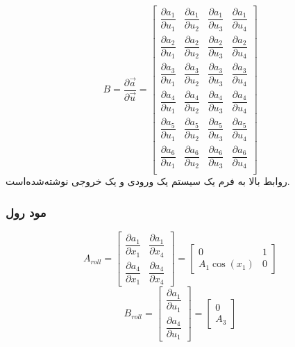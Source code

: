\begin{equation}
	B = \dfrac{\partial \vec a}{\partial \vec u} = 
	\begin{bmatrix}
		\dfrac{\partial  a_1}{\partial  u_1}&
		\dfrac{\partial  a_1}{\partial  u_2}&
		\dfrac{\partial  a_1}{\partial  u_3}&
		\dfrac{\partial  a_1}{\partial  u_4}
		\\[1em]
		\dfrac{\partial  a_2}{\partial  u_1}&
		\dfrac{\partial  a_2}{\partial  u_2}&
		\dfrac{\partial  a_2}{\partial  u_3}&
		\dfrac{\partial  a_2}{\partial  u_4}
		\\[1em]
		\dfrac{\partial  a_3}{\partial  u_1}&
		\dfrac{\partial  a_3}{\partial  u_2}&
		\dfrac{\partial  a_3}{\partial  u_3}&
		\dfrac{\partial  a_3}{\partial  u_4}
		\\[1em]
		\dfrac{\partial  a_4}{\partial  u_1}&
		\dfrac{\partial  a_4}{\partial  u_2}&
		\dfrac{\partial  a_4}{\partial  u_3}&
		\dfrac{\partial  a_4}{\partial  u_4}
		\\[1em]
		\dfrac{\partial  a_5}{\partial  u_1}&
		\dfrac{\partial  a_5}{\partial  u_2}&
		\dfrac{\partial  a_5}{\partial  u_3}&
		\dfrac{\partial  a_5}{\partial  u_4}
		\\[1em]
		\dfrac{\partial  a_6}{\partial  u_1}&
		\dfrac{\partial  a_6}{\partial  u_2}&
		\dfrac{\partial  a_6}{\partial  u_3}&
		\dfrac{\partial  a_6}{\partial  u_4}
		\\[1em]
	\end{bmatrix}
\end{equation}
روابط بالا به فرم یک سیستم یک ورودی و یک خروجی نوشته‌شده‌است.
\subsubsection{مود رول}
\begin{equation}
	A_{roll} = \begin{bmatrix}
		\dfrac{\partial  a_1}{\partial  x_1}& \dfrac{\partial  a_1}{\partial  x_4}
		\\[1em]
		\dfrac{\partial  a_4}{\partial  x_1}& \dfrac{\partial  a_4}{\partial  x_4}
	\end{bmatrix} = 
	\begin{bmatrix}
		0 & 1\\
		A_1\cos(x_1) & 0
	\end{bmatrix}
\end{equation}
\begin{equation}
	B_{roll} = \begin{bmatrix}
		\dfrac{\partial  a_1}{\partial  u_1}
		\\[1em]
		\dfrac{\partial  a_4}{\partial  u_1}
	\end{bmatrix} = 
	\begin{bmatrix}
		0\\
		A_3
	\end{bmatrix}
\end{equation}

